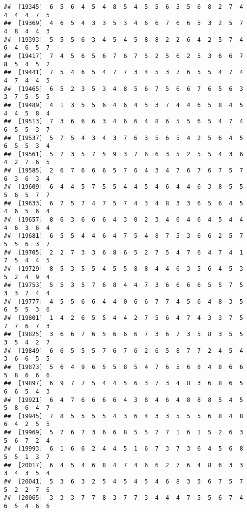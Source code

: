 \documentclass[
]{book}
\begin{document}
\begin{verbatim}
##  [19345]  6  5  6  4  5  4  8  5  4  5  5  6  5  5  6  8  2  7  4  4  4  4  7  5
##  [19369]  4  6  5  4  3  3  5  3  4  6  6  7  6  6  5  3  2  5  7  4  8  4  4  3
##  [19393]  5  5  5  6  3  4  5  4  5  8  8  2  2  6  4  2  5  7  4  6  4  6  5  7
##  [19417]  7  4  5  6  5  6  7  6  7  5  2  5  6  2  5  3  6  6  7  8  5  4  5  2
##  [19441]  7  5  4  6  5  4  7  7  3  4  5  3  7  6  5  5  4  7  4  4  7  4  4  5
##  [19465]  6  5  2  3  5  3  4  8  5  6  7  5  6  6  7  6  5  6  3  3  7  5  5  5
##  [19489]  4  1  3  5  5  6  4  6  4  5  3  7  4  4  6  5  8  4  5  4  4  5  8  4
##  [19513]  7  3  6  6  6  3  4  6  6  4  8  6  5  5  6  5  4  7  4  6  5  5  3  7
##  [19537]  5  7  5  4  3  4  3  7  6  3  5  6  5  4  2  5  6  4  5  6  5  5  3  4
##  [19561]  5  7  3  5  7  5  9  3  7  6  6  3  5  2  5  5  4  3  6  4  2  7  6  5
##  [19585]  2  6  7  6  6  6  5  7  6  4  3  4  7  6  7  6  7  5  7  6  3  6  3  4
##  [19609]  6  4  4  5  7  5  5  4  4  5  4  6  4  4  6  3  8  5  5  5  6  5  7  7
##  [19633]  6  7  5  7  4  7  5  7  4  3  4  8  3  3  6  5  6  4  5  4  6  5  6  4
##  [19657]  8  6  3  6  6  6  4  3  0  2  3  4  6  4  6  4  5  4  4  4  6  3  6  4
##  [19681]  6  5  5  4  4  6  4  7  5  4  8  7  5  3  6  6  2  5  7  5  5  6  3  7
##  [19705]  2  2  7  3  3  6  8  6  5  2  7  5  4  7  6  4  7  4  1  7  5  4  4  5
##  [19729]  8  5  3  5  5  4  5  5  8  8  4  4  6  3  5  6  4  5  3  5  2  4  9  4
##  [19753]  5  5  3  5  7  6  8  4  4  7  3  6  6  6  6  5  5  7  5  3  3  7  4  4
##  [19777]  4  5  5  6  6  4  4  0  6  6  7  7  4  5  6  4  8  3  5  6  5  5  3  6
##  [19801]  1  4  2  6  5  5  4  4  2  7  5  6  4  7  4  3  3  7  5  7  7  6  7  3
##  [19825]  3  6  6  7  6  5  6  6  6  7  3  6  7  3  5  8  3  5  5  3  5  4  2  7
##  [19849]  6  6  5  5  5  7  6  7  6  2  6  5  8  7  7  2  4  5  4  3  6  6  5  5
##  [19873]  5  6  4  9  6  5  5  8  5  4  7  6  5  6  8  4  8  6  6  5  8  6  6  6
##  [19897]  6  9  7  7  5  4  4  5  6  3  7  3  4  8  3  6  8  6  5  6  6  5  4  3
##  [19921]  6  4  7  6  6  6  6  4  3  8  4  6  4  8  8  8  5  4  5  5  8  6  4  7
##  [19945]  7  8  5  5  5  5  4  3  6  4  3  3  5  5  5  6  8  4  8  6  4  2  5  5
##  [19969]  5  7  6  7  3  6  6  8  5  5  7  7  1  6  1  5  2  6  3  5  6  7  2  4
##  [19993]  6  1  6  6  2  4  4  5  1  6  7  3  7  3  6  4  5  6  8  5  5  1  3  7
##  [20017]  6  4  5  4  6  8  4  7  4  6  6  2  7  6  4  8  6  3  3  3  4  3  5  4
##  [20041]  5  3  6  3  2  5  4  5  4  5  4  6  8  3  5  6  7  5  7  5  2  2  7  6
##  [20065]  3  3  3  7  7  8  3  7  7  3  4  4  4  7  5  5  6  7  4  6  5  4  6  6

\end{verbatim}
\end{document}
